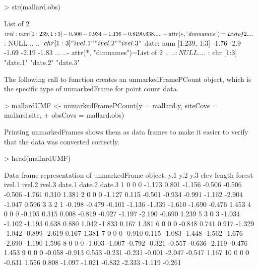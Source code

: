 \documentclass[article,shortnames]{jss}
\begin{document}
\begin{Schunk}
\begin{Sinput}
> str(mallard.obs)
\end{Sinput}
\begin{Soutput}
List of 2
 $ ivel: num [1:239, 1:3] -0.506 -0.934 -1.136 -0.819 0.638 ...
  ..- attr(*, "dimnames")=List of 2
  .. ..$ : NULL
  .. ..$ : chr [1:3] "ivel.1" "ivel.2" "ivel.3"
 $ date: num [1:239, 1:3] -1.76 -2.9 -1.69 -2.19 -1.83 ...
  ..- attr(*, "dimnames")=List of 2
  .. ..$ : NULL
  .. ..$ : chr [1:3] "date.1" "date.2" "date.3"
\end{Soutput}
\end{Schunk}

The following call to  function creates an
unmarkedFramePCount object, which is the specific type of
unmarkedFrame for point count data.

\begin{Schunk}
\begin{Sinput}
> mallardUMF <- unmarkedFramePCount(y = mallard.y, siteCovs = mallard.site, 
+     obsCovs = mallard.obs)
\end{Sinput}
\end{Schunk}

Printing unmarkedFrames shows them as data frames to make it easier to
verify that the data was converted correctly.

\begin{Schunk}
\begin{Sinput}
> head(mallardUMF)
\end{Sinput}
\begin{Soutput}
Data frame representation of unmarkedFrame object.
   y.1 y.2 y.3   elev length forest ivel.1 ivel.2 ivel.3 date.1 date.2 date.3
1    0   0   0 -1.173  0.801 -1.156 -0.506 -0.506 -0.506 -1.761  0.310  1.381
2    0   0   0 -1.127  0.115 -0.501 -0.934 -0.991 -1.162 -2.904 -1.047  0.596
3    3   2   1 -0.198 -0.479 -0.101 -1.136 -1.339 -1.610 -1.690 -0.476  1.453
4    0   0   0 -0.105  0.315  0.008 -0.819 -0.927 -1.197 -2.190 -0.690  1.239
5    3   0   3 -1.034 -1.102 -1.193  0.638  0.880  1.042 -1.833  0.167  1.381
6    0   0   0 -0.848  0.741  0.917 -1.329 -1.042 -0.899 -2.619  0.167  1.381
7    0   0   0 -0.910  0.115 -1.083 -1.448 -1.562 -1.676 -2.690 -1.190  1.596
8    0   0   0 -1.003 -1.007 -0.792 -0.321 -0.557 -0.636 -2.119 -0.476  1.453
9    0   0   0 -0.058 -0.913  0.553 -0.231 -0.231 -0.001 -2.047 -0.547  1.167
10   0   0   0 -0.631  1.556  0.808 -1.097 -1.021 -0.832 -2.333 -1.119 -0.261
\end{Soutput}
\end{Schunk}
\end{document}
